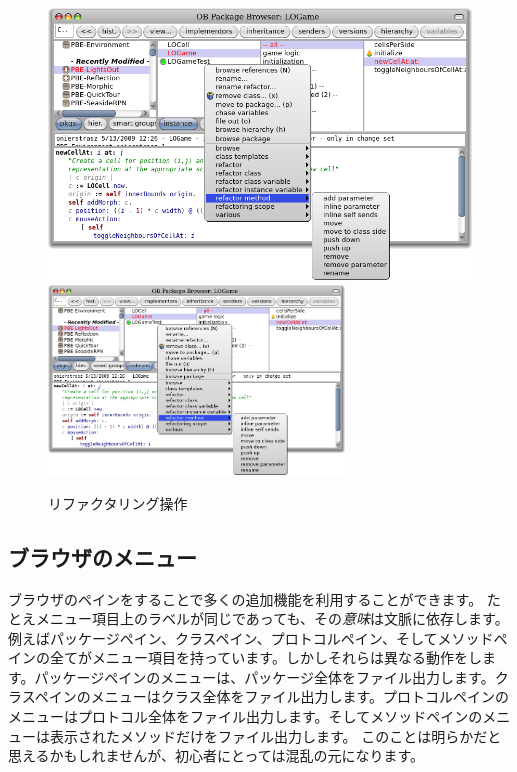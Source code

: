 \documentclass[a4paper,10pt,twoside]{book}
\begin{document}
\begin{figure}[btp]
\begin{center}
\ifluluelse
{\includegraphics[width=\textwidth]{refactoring}}
{\includegraphics[width=0.7\textwidth]{refactoring}}
\end{center}
\caption{リファクタリング操作}
\end{figure}

\subsection{ブラウザのメニュー}

ブラウザのペインを\actclick することで多くの追加機能を利用することができます。
たとえメニュー項目上のラベルが同じであっても、その\emph{意味}は文脈に依存します。
例えばパッケージペイン、クラスペイン、プロトコルペイン、そしてメソッドペインの全てがメニュー項目を持っています。しかしそれらは異なる動作をします。パッケージペインのメニューは、パッケージ全体をファイル出力します。クラスペインのメニューはクラス全体をファイル出力します。プロトコルペインのメニューはプロトコル全体をファイル出力します。そしてメソッドペインのメニューは表示されたメソッドだけをファイル出力します。
このことは明らかだと思えるかもしれませんが、初心者にとっては混乱の元になります。
\end{document}
